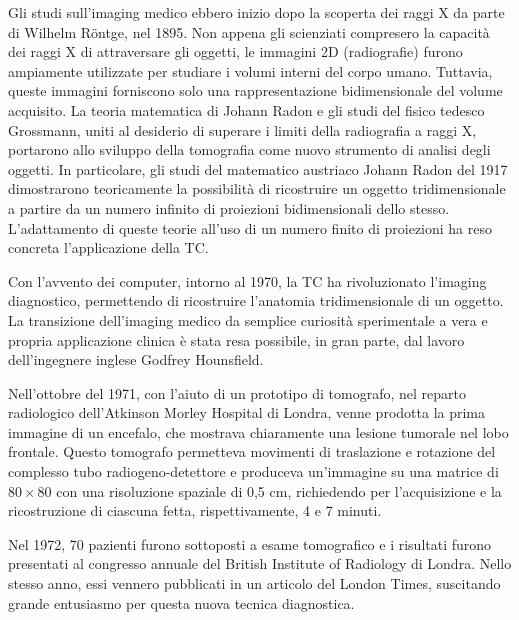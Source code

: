 \documentclass[12pt,a4paper]{report}
\begin{document}
Gli studi sull'imaging medico ebbero inizio dopo la scoperta dei raggi X da parte di Wilhelm Röntge, nel 1895.
Non appena gli scienziati compresero la capacità dei raggi X di attraversare gli oggetti, le immagini 2D (radiografie) furono
ampiamente utilizzate per studiare i volumi interni del corpo umano.
Tuttavia, queste immagini forniscono solo una rappresentazione bidimensionale del volume acquisito.
La teoria matematica di Johann Radon e gli studi del fisico tedesco Grossmann, uniti al desiderio di superare i limiti della
radiografia a raggi X, portarono allo sviluppo della tomografia come nuovo strumento di analisi degli oggetti.
In particolare, gli studi del matematico austriaco Johann Radon del 1917 dimostrarono teoricamente la possibilità di ricostruire
un oggetto tridimensionale a partire da un numero infinito di proiezioni bidimensionali dello stesso.
L'adattamento di queste teorie all'uso di un numero finito di proiezioni ha reso concreta l'applicazione della TC.

Con l'avvento dei computer, intorno al 1970, la TC ha rivoluzionato l'imaging diagnostico, permettendo di ricostruire
l'anatomia tridimensionale di un oggetto.
La transizione dell'imaging medico da semplice curiosità sperimentale a vera e propria applicazione clinica è stata resa
possibile, in gran parte, dal lavoro dell'ingegnere inglese Godfrey Hounsfield.

Nell'ottobre del 1971, con l'aiuto di un prototipo di tomografo, nel reparto radiologico dell'Atkinson Morley Hospital di Londra,
venne prodotta la prima immagine di un encefalo, che mostrava chiaramente una lesione tumorale nel lobo frontale.
Questo tomografo permetteva movimenti di traslazione e rotazione del complesso tubo radiogeno-detettore e produceva un'immagine su
una matrice di \(80 \times 80\) con una risoluzione spaziale di 0,5 cm, richiedendo per l'acquisizione e la ricostruzione di
ciascuna fetta, rispettivamente, 4 e 7 minuti.

Nel 1972, 70 pazienti furono sottoposti a esame tomografico e i risultati furono presentati al congresso annuale del British
Institute of Radiology di Londra.
Nello stesso anno, essi vennero pubblicati in un articolo del London Times, suscitando grande entusiasmo per questa nuova tecnica
diagnostica.
\end{document}
